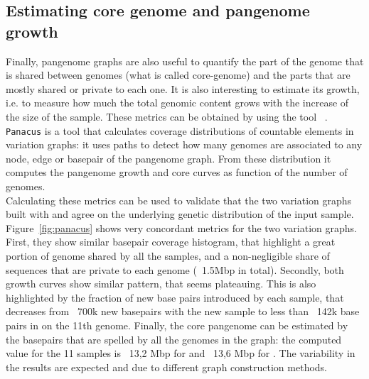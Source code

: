\subsection{Estimating core genome and pangenome growth}
\label{sec:core_pg}
Finally, pangenome graphs are also useful to quantify the part of the genome that is shared between genomes (what is called core-genome) and the parts that are mostly shared or private to each one. It is also interesting to estimate its growth, i.e. to measure how much the total genomic content grows with the increase of the size of the sample. These metrics can be obtained by using the tool \panacus~\cite{panacus}. \texttt{Panacus} is a tool that calculates coverage distributions of countable elements in variation graphs: it uses paths to detect how many genomes are associated to any node, edge or basepair of the pangenome graph. From these distribution it computes the pangenome growth and core curves as function of the number of genomes.\\
Calculating these metrics can be used to validate that the two variation graphs built with \pggb and \mcactus agree on the underlying genetic distribution of the input sample.\\
Figure~\ref{fig:panacus} shows very concordant metrics for the two variation graphs. First, they show similar basepair coverage histogram, that highlight a great portion of genome shared by all the samples, and a non-negligible share of sequences that are private to each genome (~1.5Mbp in total). Secondly, both growth curves show similar pattern, that seems plateauing. This is also highlighted by the fraction of new base pairs introduced by each sample, that decreases from ~700k new basepairs with the new sample to less than ~142k base pairs in on the 11th genome. Finally, the core pangenome can be estimated by the basepairs that are spelled by all the genomes in the graph: the computed value for the 11 samples is ~13,2 Mbp for \pggb and ~13,6 Mbp for \mcactus. The variability in the results are expected and due to different graph construction methods.

